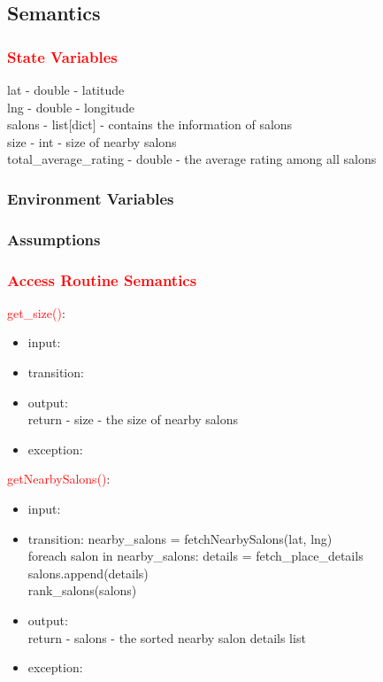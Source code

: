 \documentclass[12pt, titlepage]{article}
\begin{document}
\subsection{Semantics}

\subsubsection{\textcolor{red}{State Variables}}

lat - double - latitude \\ 
lng - double - longitude \\ 
salons - list[dict] - contains the information of salons \\ 
size - int - size of nearby salons \\ 
total\_average\_rating - double - the average rating among all salons 

\subsubsection{Environment Variables}

\subsubsection{Assumptions}
\color{red}
\subsubsection{\textcolor{red}{Access Routine Semantics}}

\noindent \textcolor{red}{get\_size()}:
\begin{itemize}
\item input:
\item transition:  
\item output: \\ 
return - size - the size of nearby salons
\item exception: 
\end{itemize}

\noindent \textcolor{red}{getNearbySalons()}:
\begin{itemize}
\item input: 
\item transition: 
nearby\_salons = fetchNearbySalons(lat, lng) \\ 
foreach salon in nearby\_salons:
details = fetch\_place\_details \\
salons.append(details) \\ 
rank\_salons(salons)
\item output: \\
return - salons - the sorted nearby salon details list
\item exception: 
\end{itemize}
\end{document}
